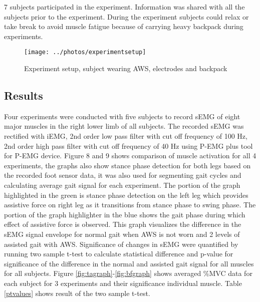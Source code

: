 \documentclass[letterpaper, 10 pt, conference]{ieeeconf}  %
\begin{document}
7 subjects participated in the experiment. Information was shared with all the subjects prior to the experiment. During the experiment subjects could relax or take break to avoid muscle fatigue because of carrying heavy backpack during experiments.


\begin{figure}
	\centering
	\texttt{[image: ../photos/experimentsetup]}
	\caption{Experiment setup, subject wearing AWS, electrodes and backpack }
	\label{fig:experimentsetup}
\end{figure}

\subsection{Results}

Four experiments were conducted with five subjects to record sEMG of eight major muscles in the right lower limb of all subjects. The recorded sEMG was rectified with iEMG, 2nd order low pass filter with cut off frequency of 100 Hz, 2nd order high pass filter with cut off frequency of 40 Hz using P-EMG plus tool for P-EMG device. Figure 8 and 9 shows comparison of muscle activation for all 4 experiments, the graphs also show stance phase detection for both legs based on the recorded foot sensor data, it was also used for segmenting gait cycles and calculating average gait signal for each experiment.  The portion of the graph highlighted in the green is stance phase detection on the left leg which provides assistive force on right leg as it transitions  from stance phase to swing phase. The portion of the graph highlighter in the blue shows the gait phase during which effect of assistive force is observed. This graph visualizes the difference in the sEMG signal envelope for normal gait when AWS is not worn and 2 levels of assisted gait with AWS. Significance of  changes in sEMG were quantified by running two sample t-test to calculate statistical difference and p-value for significance of the difference in the normal and assisted gait signal for all muscles for all subjects. Figure \ref{fig:tagraph}-\ref{fig:bfgraph} shows averaged \%MVC data for each subject for 3 experiments and their significance individual muscle. Table \ref{ptvalues} shows result of the two sample t-test.
\end{document}
